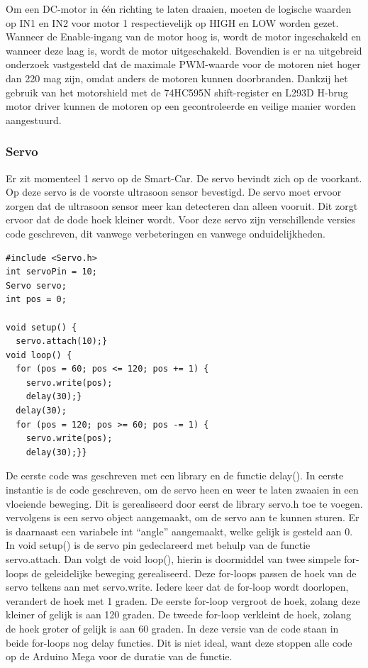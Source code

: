 Om een DC-motor in één richting te laten draaien, moeten de logische waarden op IN1 en IN2 voor motor 1 respectievelijk op HIGH en LOW worden gezet. Wanneer de Enable-ingang van de motor hoog is, wordt de motor ingeschakeld en wanneer deze laag is, wordt de motor uitgeschakeld. Bovendien is er na uitgebreid onderzoek vastgesteld dat de maximale \gls{PWM}-waarde voor de motoren niet hoger dan 220 mag zijn, omdat anders de motoren kunnen doorbranden. Dankzij het gebruik van het \gls{motorshield} met de 74HC595N\cite{shiftregister} \gls{shift-register} en L293D\cite{h-brug} \gls{H-brug} motor driver kunnen de motoren op een gecontroleerde en veilige manier worden aangestuurd.

\subsubsection{Servo}
Er zit momenteel 1 servo op de \gls{Smart-Car}. De servo bevindt zich op de voorkant. Op deze servo is de voorste ultrasoon sensor bevestigd. De servo moet ervoor zorgen dat de ultrasoon sensor meer kan detecteren dan alleen vooruit. Dit zorgt ervoor dat de dode hoek kleiner wordt. Voor deze servo zijn verschillende versies code geschreven, dit vanwege verbeteringen en vanwege onduidelijkheden. 

\begin{lstlisting}
#include <Servo.h>
int servoPin = 10;
Servo servo;
int pos = 0;   

void setup() {
  servo.attach(10);}
void loop() {
  for (pos = 60; pos <= 120; pos += 1) { 
    servo.write(pos);              
    delay(30);}
  delay(30);
  for (pos = 120; pos >= 60; pos -= 1) {
    servo.write(pos);              
    delay(30);}}
\end{lstlisting}

De eerste code was geschreven met een library en de functie delay(). In eerste instantie is de code geschreven, om de servo heen en weer te laten zwaaien in een vloeiende beweging. Dit is gerealiseerd door eerst de library servo.h toe te voegen. vervolgens is een servo object aangemaakt, om de servo aan te kunnen sturen. Er is daarnaast een variabele int “angle” aangemaakt, welke gelijk is gesteld aan 0.  In void setup() is de servo pin gedeclareerd met behulp van de functie servo.attach. 
Dan volgt de void loop(), hierin is doormiddel van twee simpele for-loops de geleidelijke beweging gerealiseerd. Deze for-loops passen de hoek van de servo telkens aan met servo.write. Iedere keer dat de for-loop wordt doorlopen, verandert de hoek met 1 graden. De eerste for-loop vergroot de hoek, zolang deze kleiner of gelijk is aan 120 graden. De tweede for-loop verkleint de hoek, zolang de hoek groter of gelijk is aan 60 graden. In deze versie van de code staan in beide for-loops nog delay functies. Dit is niet ideal, want deze stoppen alle code op de Arduino Mega\cite{ArduinoMEGA} voor de duratie van de functie. 

